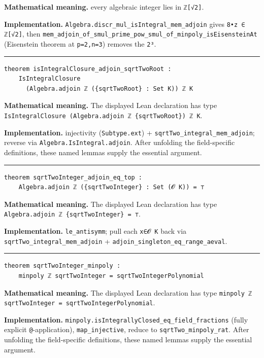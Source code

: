 \documentclass[UTF8,a4paper,11pt,fontset=fandol]{ctexart}
\theoremstyle{definition}
\newcommand{\statementsep}{\par\medskip\hrule\medskip}
\begin{document}
\noindent\textbf{Mathematical meaning.} every algebraic integer lies in \texttt{ℤ[√2]}.\par
\noindent\textbf{Implementation.} \texttt{Algebra.\allowbreak{}discr\_\allowbreak{}mul\_\allowbreak{}isIntegral\_\allowbreak{}mem\_\allowbreak{}adjoin} gives \texttt{8•z ∈ ℤ[√2]}, then \texttt{mem\_\allowbreak{}adjoin\_\allowbreak{}of\_\allowbreak{}smul\_\allowbreak{}prime\_\allowbreak{}pow\_\allowbreak{}smul\_\allowbreak{}of\_\allowbreak{}minpoly\_\allowbreak{}isEisensteinAt} (Eisenstein theorem at \texttt{p=2,n=3}) removes the \texttt{2³}.\par
\statementsep
\begin{verbatim}
theorem isIntegralClosure_adjoin_sqrtTwoRoot :
    IsIntegralClosure
      (Algebra.adjoin ℤ ({sqrtTwoRoot} : Set K)) ℤ K
\end{verbatim}
\noindent\textbf{Mathematical meaning.} The displayed Lean declaration has type \texttt{IsIntegralClosure (Algebra.\allowbreak{}adjoin ℤ \{sqrtTwoRoot\}) ℤ K}.\par
\noindent\textbf{Implementation.} injectivity (\texttt{Subtype.\allowbreak{}ext}) + \texttt{sqrtTwo\_\allowbreak{}integral\_\allowbreak{}mem\_\allowbreak{}adjoin}; reverse via \texttt{Algebra.\allowbreak{}IsIntegral.\allowbreak{}adjoin}. After unfolding the field-specific definitions, these named lemmas supply the essential argument.\par
\statementsep
\begin{verbatim}
theorem sqrtTwoInteger_adjoin_eq_top :
    Algebra.adjoin ℤ ({sqrtTwoInteger} : Set (𝓞 K)) = ⊤
\end{verbatim}
\noindent\textbf{Mathematical meaning.} The displayed Lean declaration has type \texttt{Algebra.\allowbreak{}adjoin ℤ \{sqrtTwoInteger\} = ⊤}.\par
\noindent\textbf{Implementation.} \texttt{le\_\allowbreak{}antisymm}; pull each \texttt{x∈𝓞 K} back via \texttt{sqrtTwo\_\allowbreak{}integral\_\allowbreak{}mem\_\allowbreak{}adjoin} + \texttt{adjoin\_\allowbreak{}singleton\_\allowbreak{}eq\_\allowbreak{}range\_\allowbreak{}aeval}.\par
\statementsep
\begin{verbatim}
theorem sqrtTwoInteger_minpoly :
    minpoly ℤ sqrtTwoInteger = sqrtTwoIntegerPolynomial
\end{verbatim}
\noindent\textbf{Mathematical meaning.} The displayed Lean declaration has type \texttt{minpoly ℤ sqrtTwoInteger = sqrtTwoIntegerPolynomial}.\par
\noindent\textbf{Implementation.} \texttt{minpoly.\allowbreak{}isIntegrallyClosed\_\allowbreak{}eq\_\allowbreak{}field\_\allowbreak{}fractions} (fully explicit \texttt{@}-application), \texttt{map\_\allowbreak{}injective}, reduce to \texttt{sqrtTwo\_\allowbreak{}minpoly\_\allowbreak{}rat}. After unfolding the field-specific definitions, these named lemmas supply the essential argument.\par
\end{document}
